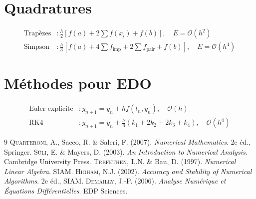 \documentclass[12pt,a4paper,twoside]{book}
\theoremstyle{definition}
\theoremstyle{plain}
\theoremstyle{remark}
\newcommand{\BigO}{\mathcal{O}}
\begin{document}
\section{Quadratures}
\begin{align}
\text{Trap\`ezes} &: \frac{h}{2}[f(a)+2\sum f(x_i)+f(b)], \quad E=\BigO(h^2) \\
\text{Simpson} &: \frac{h}{3}[f(a)+4\sum f_{\text{imp}}+2\sum f_{\text{pair}}+f(b)], \quad E=\BigO(h^4)
\end{align}

\section{M\'ethodes pour EDO}
\begin{align}
\text{Euler explicite} &: y_{n+1}=y_n+hf(t_n,y_n), \quad \BigO(h) \\
\text{RK4} &: y_{n+1}=y_n+\tfrac{h}{6}(k_1+2k_2+2k_3+k_4), \quad \BigO(h^4)
\end{align}

\begin{thebibliography}{9}
 \textsc{Quarteroni}, A., Sacco, R. \& Saleri, F. (2007). \emph{Numerical Mathematics}. 2e \'ed., Springer.
 \textsc{S\"uli}, E. \& Mayers, D. (2003). \emph{An Introduction to Numerical Analysis}. Cambridge University Press.
 \textsc{Trefethen}, L.N. \& Bau, D. (1997). \emph{Numerical Linear Algebra}. SIAM.
 \textsc{Higham}, N.J. (2002). \emph{Accuracy and Stability of Numerical Algorithms}. 2e \'ed., SIAM.
 \textsc{Demailly}, J.-P. (2006). \emph{Analyse Num\'erique et \'Equations Diff\'erentielles}. EDP Sciences.
\end{thebibliography}

\printindex
\end{document}
